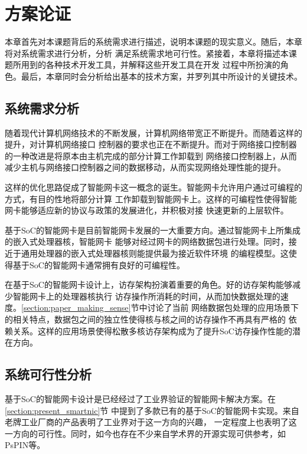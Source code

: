 \section{方案论证}

本章首先对本课题背后的系统需求进行描述，说明本课题的现实意义。随后，本章将对系统需求进行分析，分析
满足系统需求地可行性。紧接着，本章将描述本课题所用到的各种技术开发工具，并解释这些开发工具在开发
过程中所扮演的角色。最后，本章同时会分析给出基本的技术方案，并罗列其中所设计的关键技术。

\subsection{系统需求分析}

随着现代计算机网络技术的不断发展，计算机网络带宽正不断提升。而随着这样的提升，对计算机网络接口
控制器的要求也正在不断提升。而对于网络接口控制器的一种改进是将原本由主机完成的部分计算工作卸载到
网络接口控制器上，从而减少主机与网络接口控制器之间的数据移动，从而实现网络处理性能的提升。

这样的优化思路促成了智能网卡这一概念的诞生。智能网卡允许用户通过可编程的方式，有目的性地将部分计算
工作卸载到智能网卡上。这样的可编程性使得智能网卡能够适应新的协议与政策的发展进化，并积极对接
快速更新的上层软件。

基于SoC的智能网卡是目前智能网卡发展的一大重要方向。通过智能网卡上所集成的嵌入式处理器核，智能网卡
能够对经过网卡的网络数据包进行处理。同时，接近于通用处理器的嵌入式处理器核则能提供最为接近软件环境
的编程模型。这使得基于SoC的智能网卡通常拥有良好的可编程性。

在基于SoC的智能网卡设计上，访存架构扮演着重要的角色。好的访存架构能够减少智能网卡上的处理器核执行
访存操作所消耗的时间，从而加快数据处理的速度。\ref{section:paper_making_sense}节中讨论了当前
网络数据包处理的应用场景下的相关特点，数据包之间的独立性使得核与核之间的访存操作不再具有严格的
依赖关系。这样的应用场景使得松散多核访存架构成为了提升SoC访存操作性能的潜在方向。

\subsection{系统可行性分析}

基于SoC的智能网卡设计是已经经过了工业界验证的智能网卡解决方案。在\ref{section:present_smartnic}节
中提到了多款已有的基于SoC的智能网卡实现。来自老牌工业厂商的产品表明了工业界对于这一方向的兴趣，
一定程度上也表明了这一方向的可行性。同时，如今也存在不少来自学术界的开源实现可供参考，如PsPIN\cite{di2020pspin}等。

